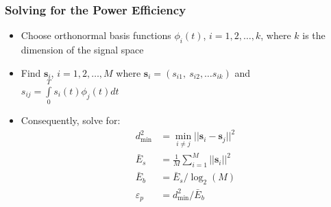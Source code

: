 \documentclass[10pt]{beamer}
\begin{document}
{
  \frametitle{Solving for the Power Efficiency}

    \begin{itemize}
        \item Choose orthonormal basis functions $\phi_i(t)$, $i=1,2,\ldots,k$, where $k$ is the dimension of the signal space
        \item Find $\mathbf{s}_i$, $i=1,2,\ldots,M$ where $\mathbf{s}_i=(s_{i1},~s_{i2},\ldots{s_{ik}})$ and $s_{ij}=\int\limits_0^Ts_i(t)\phi_j(t)dt$
        \item Consequently, solve for:
        \begin{equation}
        \begin{split}
            d_{\min}^2&=\min\limits_{i\neq{j}}||{\mathbf{s}_i-\mathbf{s}_j}||^2\\
            \bar{E}_s&=\frac{1}{M}\sum\limits_{i=1}^{M}||\mathbf{s}_i||^2\\
            \bar{E}_b&=\bar{E}_s/\log_2(M)\\
            \varepsilon_p&=d_{\min}^2/\bar{E}_b\nonumber
        \end{split}
        \end{equation}
    \end{itemize}
}
\end{document}
